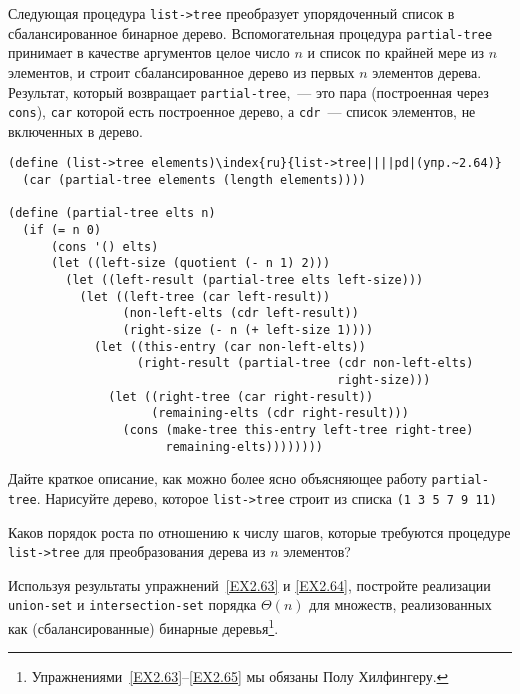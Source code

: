 \begin{exercise}{2.64}\label{EX2.64}%
%
% 
Следующая процедура {\tt list->tree}
преобразует упорядоченный список в сбалансированное
бинарное дерево. 
Вспомогательная процедура {\tt partial-tree} принимает в
качестве аргументов целое число $n$ и список по крайней
мере из $n$ элементов, и строит сбалансированное дерево из
первых $n$ элементов дерева.  Результат, который 
возвращает {\tt partial-tree},~--- это пара (построенная через
{\tt cons}), {\tt car} которой есть построенное дерево,
а {\tt cdr}~--- список элементов, не включенных в дерево.

\begin{Verbatim}[fontsize=\small]
(define (list->tree elements)\index{ru}{list->tree||||pd|(упр.~2.64)}
  (car (partial-tree elements (length elements))))

(define (partial-tree elts n)
  (if (= n 0)
      (cons '() elts)
      (let ((left-size (quotient (- n 1) 2)))
        (let ((left-result (partial-tree elts left-size)))
          (let ((left-tree (car left-result))
                (non-left-elts (cdr left-result))
                (right-size (- n (+ left-size 1))))
            (let ((this-entry (car non-left-elts))
                  (right-result (partial-tree (cdr non-left-elts)
                                              right-size)))
              (let ((right-tree (car right-result))
                    (remaining-elts (cdr right-result)))
                (cons (make-tree this-entry left-tree right-tree)
                      remaining-elts))))))))
\end{Verbatim}

\begin{plainenum}

\item
Дайте краткое описание, как можно более ясно
объясняющее работу {\tt partial-tree}.  Нарисуйте дерево,
которое {\tt list->tree} строит из списка {\tt (1 3 5 7 9 11)}

\item
Каков порядок роста по отношению к числу шагов,
которые требуются процедуре \linebreak
\mbox{{\tt list->tree}} для преобразования
дерева из $n$ элементов?
\end{plainenum}
\end{exercise}
\begin{exercise}{2.65}\label{EX2.65}%
Используя результаты упражнений~\ref{EX2.63}
и \ref{EX2.64}, постройте реализации {\tt union-set} и {\tt in\-ter\-sec\-tion-set}
порядка $\Theta (n)$ для
множеств, реализованных как (сбалансированные) бинарные деревья\footnote{Упражнениями~\ref{EX2.63}--\ref{EX2.65} мы обязаны  Полу Хилфингеру.
}.
\end{exercise}%

